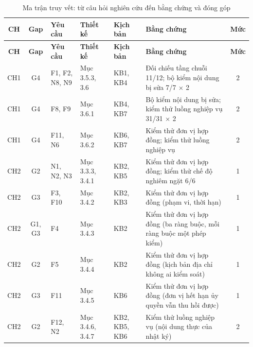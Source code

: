 \begin{longtable}{|c|c|p{2.3cm}|p{1.9cm}|p{1.6cm}|p{2.4cm}|c|}
\caption{Ma trận truy vết: từ câu hỏi nghiên cứu đến bằng chứng và đóng góp}
\label{tab:traceability} \\

\hline
\textbf{CH} & \textbf{Gap} & \textbf{Yêu cầu} & \textbf{Thiết kế} & \textbf{Kịch bản} & \textbf{Bằng chứng} & \textbf{Mức} \\
\hline
\endfirsthead

\hline
\textbf{CH} & \textbf{Gap} & \textbf{Yêu cầu} & \textbf{Thiết kế} & \textbf{Kịch bản} & \textbf{Bằng chứng} & \textbf{Mức} \\
\hline
\endhead

\hline
\endfoot

\hline
\endlastfoot

CH1 & G4 & F1, F2, N8, N9
& Mục 3.5.3, 3.6
& KB1, KB4
& Đối chiếu tầng chuỗi 11/12; bộ kiểm nội dung bị sửa 7/7 $\times$ 2
& 2
\\ \hline

CH1 & G4 & F8, F9
& Mục 3.6.1
& KB4, KB7
& Bộ kiểm nội dung bị sửa; kiểm thử luồng nghiệp vụ 31/31 $\times$ 2
& 2
\\ \hline

CH1 & G4 & F11, N6
& Mục 3.6.2
& KB6, KB7
& Kiểm thử đơn vị hợp đồng; kiểm thử luồng nghiệp vụ
& 2
\\ \hline

CH2 & G2 & N1, N2, N3
& Mục 3.3.3, 3.4.1
& KB2, KB5
& Kiểm thử đơn vị hợp đồng; kiểm thử chế độ nghiêm ngặt 6/6
& 1
\\ \hline

CH2 & G3 & F3, F10
& Mục 3.4.2
& KB2, KB3
& Kiểm thử đơn vị hợp đồng (phạm vi, thời hạn)
& 1
\\ \hline

CH2 & G1, G3 & F4
& Mục 3.4.3
& KB2
& Kiểm thử đơn vị hợp đồng (ba ràng buộc, mỗi ràng buộc một phép kiểm)
& 1
\\ \hline

CH2 & G2 & F5
& Mục 3.4.4
& KB2
& Kiểm thử đơn vị hợp đồng (kịch bản địa chỉ không ai kiểm soát)
& 1
\\ \hline

CH2 & G3 & F11
& Mục 3.4.5
& KB6
& Kiểm thử đơn vị hợp đồng (đơn vị hết hạn ủy quyền vẫn thu hồi được)
& 1
\\ \hline

CH2 & G2 & F12, N2
& Mục 3.4.6, 3.4.7
& KB2, KB5, KB6
& Kiểm thử luồng nghiệp vụ (nội dung thực của nhật ký)
& 2
\\ \hline


\end{longtable}
